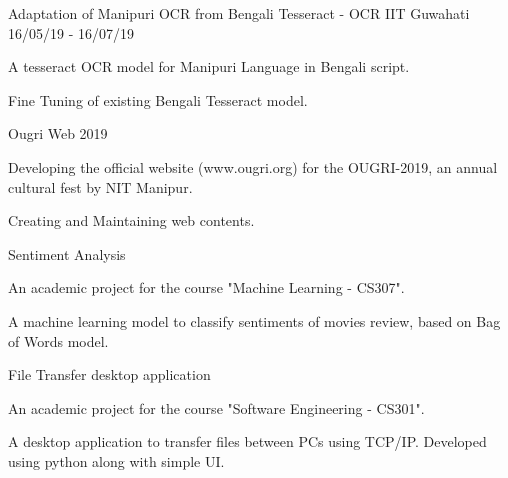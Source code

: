 
\begin{cventries}
  \cventry
    {} %
    {Adaptation of Manipuri OCR from Bengali Tesseract - OCR} %
    {IIT Guwahati} %
    {16/05/19 - 16/07/19} %
    {
      \begin{cvitems} %
        \item {A tesseract OCR model for Manipuri Language in Bengali script.}
		\item {Fine Tuning of existing Bengali Tesseract model.}
      \end{cvitems}
    }

  \cventry
    {} %
    {Ougri Web 2019} %
    {} %
    {} %
    {
      \begin{cvitems} %
      	\item {Developing the official website (www.ougri.org) for the OUGRI-2019, an annual cultural fest by NIT Manipur.}
		\item {Creating and Maintaining web contents.}
      \end{cvitems}
    }
  \cventry
    {} %
    {Sentiment Analysis} %
    {} %
    {} %
    {
      \begin{cvitems} %
      	\item {An academic project for the course "Machine Learning - CS307".}
		\item {A machine learning model to classify sentiments of movies review, based on Bag of Words model.}
      \end{cvitems}
    }
  \cventry
    {} %
    {File Transfer desktop application} %
    {} %
    {} %
    {
      \begin{cvitems} %
      	\item {An academic project for the course "Software Engineering - CS301".}
		\item {A desktop application to transfer files between PCs using TCP/IP. Developed using python along with simple UI.}
      \end{cvitems}
    }
\end{cventries}